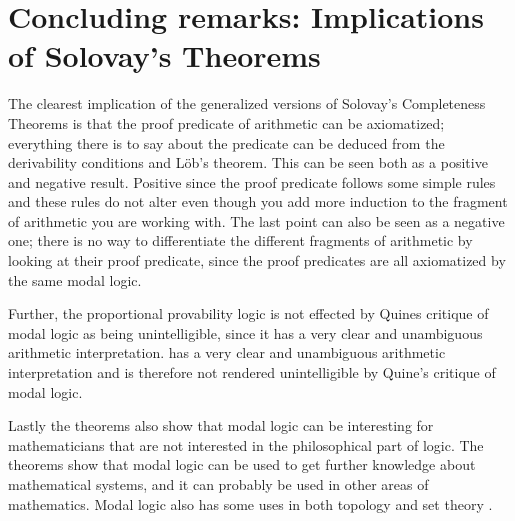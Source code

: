 \documentclass[../main.tex]{subfiles}
\begin{document}
\section{Concluding remarks: Implications of Solovay's Theorems}

The clearest implication of the generalized versions of Solovay's Completeness
Theorems is that the proof predicate of arithmetic can be axiomatized;
everything there is to say about the predicate can be deduced from the
derivability conditions and Löb's theorem. This can be seen both as a positive
and negative result. Positive since the proof predicate follows some simple
rules and these rules  do not alter even though you add more induction to the
fragment of arithmetic you are working with. The last point can also be seen
as a negative one; there is no way to differentiate the different fragments of
arithmetic by looking at their proof predicate, since the proof predicates are
all axiomatized by the same modal logic.

Further, the proportional provability logic is not effected by Quines critique of
modal logic as being unintelligible, since it has a very clear and unambiguous
arithmetic interpretation. has a very clear and unambiguous arithmetic interpretation and is therefore not rendered unintelligible by Quine's critique of modal logic.

Lastly the theorems also show that modal logic can be interesting for
mathematicians that are not interested in the philosophical part of logic. The
theorems show that modal logic can be used to get further knowledge about
mathematical systems, and it can probably be used in other areas of mathematics.
Modal logic also has some uses in both topology and set theory
\parencite{Artemov2007}.
\end{document}
